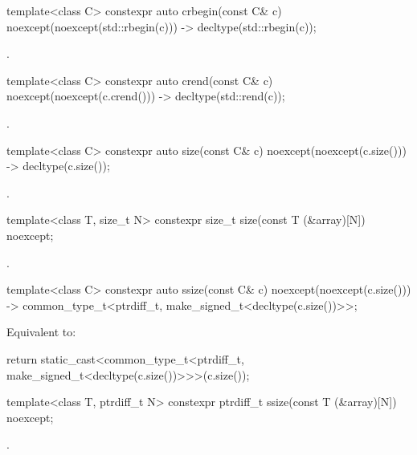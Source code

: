 %
\begin{itemdecl}
template<class C> constexpr auto crbegin(const C& c) noexcept(noexcept(std::rbegin(c)))
  -> decltype(std::rbegin(c));
\end{itemdecl}
\begin{itemdescr}
\pnum
\returns
{}.
\end{itemdescr}

%
\begin{itemdecl}
template<class C> constexpr auto crend(const C& c) noexcept(noexcept(c.crend()))
  -> decltype(std::rend(c));
\end{itemdecl}
\begin{itemdescr}
\pnum
\returns
{}.
\end{itemdescr}

%
\begin{itemdecl}
template<class C> constexpr auto size(const C& c) noexcept(noexcept(c.size()))
  -> decltype(c.size());
\end{itemdecl}
\begin{itemdescr}
\pnum
\returns
{}.
\end{itemdescr}

%
\begin{itemdecl}
template<class T, size_t N> constexpr size_t size(const T (&array)[N]) noexcept;
\end{itemdecl}
\begin{itemdescr}
\pnum
\returns
{}.
\end{itemdescr}

%
\begin{itemdecl}
template<class C> constexpr auto ssize(const C& c) noexcept(noexcept(c.size()))
  -> common_type_t<ptrdiff_t, make_signed_t<decltype(c.size())>>;
\end{itemdecl}
\begin{itemdescr}
\pnum
\effects
Equivalent to:
\begin{codeblock}
return static_cast<common_type_t<ptrdiff_t, make_signed_t<decltype(c.size())>>>(c.size());
\end{codeblock}
\end{itemdescr}

%
\begin{itemdecl}
template<class T, ptrdiff_t N> constexpr ptrdiff_t ssize(const T (&array)[N]) noexcept;
\end{itemdecl}
\begin{itemdescr}
\pnum
\returns
{}.
\end{itemdescr}

